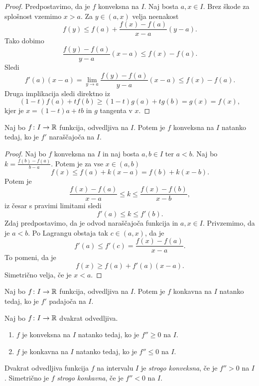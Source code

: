 \documentclass[12pt, a4paper]{article}
\begin{document}
\begin{proof}
Predpostavimo, da je $f$ konveksna na $I$. Naj bosta $a,x\in I$. Brez škode za splošnost vzemimo $x>a$. Za $y\in (a,x)$ velja neenakost
\[
f(y)\leq f(a)+\frac{f(x)-f(a)}{x-a}(y-a).
\]
Tako dobimo
\[
\frac{f(y)-f(a)}{y-a}(x-a)\leq f(x)-f(a).
\]
Sledi
\[
f'(a)(x-a)=\lim_{y\to a}\frac{f(y)-f(a)}{y-a}(x-a)\leq f(x)-f(a).
\]
Druga implikacija sledi direktno iz
\[
(1-t)f(a)+tf(b)\geq (1-t)g(a)+tg(b)=g(x)=f(x),
\]
kjer je $x=(1-t)a+tb$ in $g$ tangenta v $x$.
\end{proof}

\begin{izrek}
Naj bo $f\colon I\to\mathbb{R}$ funkcija, odvedljiva na $I$. Potem je $f$ konveksna na $I$ natanko tedaj, ko je $f'$ naraščajoča na $I$.
\end{izrek}

\begin{proof}
Naj bo $f$ konveksna na $I$ in naj bosta $a,b\in I$ ter $a<b$. Naj bo $k=\frac{f(b)-f(a)}{b-a}$. Potem je za vse $x\in(a,b)$
\[
f(x)\leq f(a)+k(x-a)=f(b)+k(x-b).
\]
Potem je
\[
\frac{f(x)-f(a)}{x-a}\leq k\leq\frac{f(x)-f(b)}{x-b},
\]
iz česar s pravimi limitami sledi
\[
f'(a)\leq k\leq f'(b).
\]
Zdaj predpostavimo, da je odvod naraščajoča funkcija in $a,x\in I$. Privzemimo, da je $a<b$. Po Lagrangu obstaja tak $c\in(a,x)$, da je
\[
f'(a)\leq f'(c)=\frac{f(x)-f(a)}{x-a}.
\]
To pomeni, da je
\[
f(x)\geq f(a)+f'(a)(x-a).
\]
Simetrično velja, če je $x<a$.
\end{proof}

\begin{posledica}
Naj bo $f\colon I\to\mathbb{R}$ funkcija, odvedljiva na $I$. Potem je $f$ konkavna na $I$ natanko tedaj, ko je $f'$ padajoča na $I$.
\end{posledica}

\begin{posledica}
Naj bo $f\colon I\to\mathbb{R}$ dvakrat odvedljiva.

\begin{enumerate}[label=\roman*)]
\item $f$ je konveksna na $I$ natanko tedaj, ko je $f''\geq 0$ na $I$.
\item $f$ je konkavna na $I$ natanko tedaj, ko je $f''\leq 0$ na $I$.
\end{enumerate}
\end{posledica}

\begin{definicija}
Dvakrat odvedljiva funkcija $f$ na intervalu $I$ je \emph{strogo konveksna}, če je $f''>0$ na $I$. Simetrično je $f$ \emph{strogo konkavna}, če je $f''<0$ na $I$.
\end{definicija}
\end{document}
